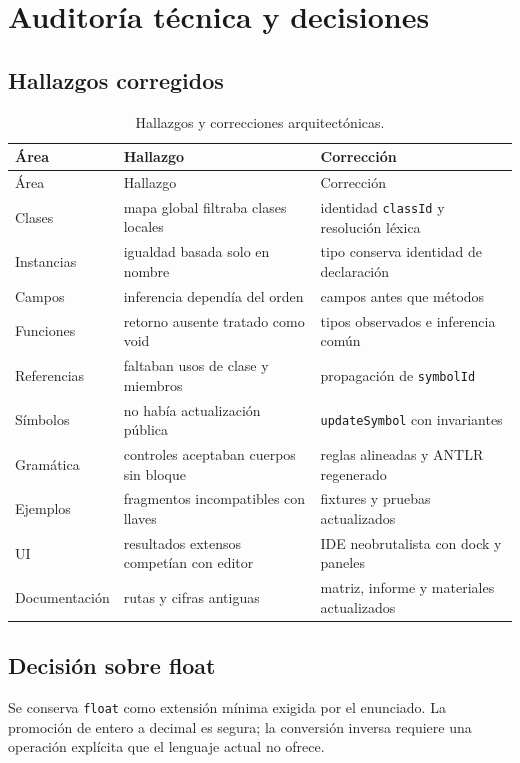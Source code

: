 \documentclass[11pt,letterpaper,oneside]{report}
\newcommand{\codigo}[1]{\texttt{#1}}
\begin{document}
\chapter{Auditoría técnica y decisiones}

\section{Hallazgos corregidos}

\begin{longtable}{p{}p{}p{}}
\caption{Hallazgos y correcciones arquitectónicas.}\label{tab:audit}\\
\toprule
Área & Hallazgo & Corrección \\
\midrule
\endfirsthead
\toprule
Área & Hallazgo & Corrección \\
\midrule
\endhead
Clases & mapa global filtraba clases locales & identidad \codigo{classId} y resolución léxica \\
Instancias & igualdad basada solo en nombre & tipo conserva identidad de declaración \\
Campos & inferencia dependía del orden & campos antes que métodos \\
Funciones & retorno ausente tratado como void & tipos observados e inferencia común \\
Referencias & faltaban usos de clase y miembros & propagación de \codigo{symbolId} \\
Símbolos & no había actualización pública & \codigo{updateSymbol} con invariantes \\
Gramática & controles aceptaban cuerpos sin bloque & reglas alineadas y ANTLR regenerado \\
Ejemplos & fragmentos incompatibles con llaves & fixtures y pruebas actualizados \\
UI & resultados extensos competían con editor & IDE neobrutalista con dock y paneles \\
Documentación & rutas y cifras antiguas & matriz, informe y materiales actualizados \\
\bottomrule
\end{longtable}

\section{Decisión sobre float}

Se conserva \codigo{float} como extensión mínima exigida por el enunciado. La
promoción de entero a decimal es segura; la conversión inversa requiere una operación
explícita que el lenguaje actual no ofrece.
\end{document}
